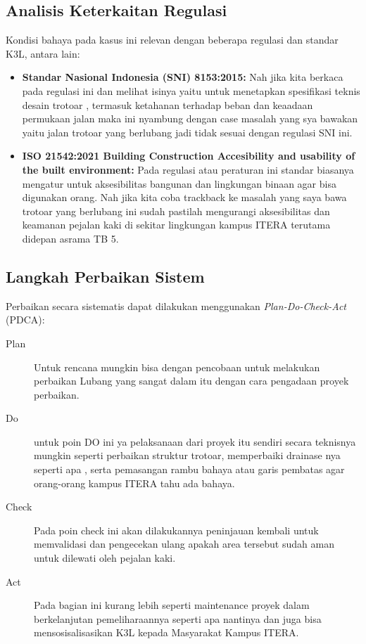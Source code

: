 \documentclass[a4paper, 12pt]{article}
\begin{document}
\subsection{Analisis Keterkaitan Regulasi}
Kondisi bahaya pada kasus ini relevan dengan beberapa regulasi dan standar K3L, antara lain:
\begin{itemize}
    \item \textbf{Standar Nasional Indonesia (SNI) 8153:2015:} Nah jika kita berkaca pada regulasi ini dan melihat isinya yaitu untuk menetapkan spesifikasi teknis desain trotoar , termasuk ketahanan terhadap beban dan keaadaan permukaan jalan maka ini nyambung dengan case masalah yang sya bawakan yaitu jalan trotoar yang berlubang jadi tidak sesuai dengan regulasi SNI ini.
    \item \textbf{ISO 21542:2021 Building Construction Accesibility and usability of the built environment:} Pada regulasi atau peraturan ini standar biasanya mengatur untuk aksesibilitas bangunan dan lingkungan binaan agar bisa digunakan orang. Nah jika kita coba trackback ke masalah yang saya bawa trotoar yang berlubang ini sudah pastilah mengurangi aksesibilitas dan keamanan pejalan kaki di sekitar lingkungan kampus ITERA terutama didepan asrama TB 5.
\end{itemize}

\subsection{Langkah Perbaikan Sistem}
Perbaikan secara sistematis dapat dilakukan menggunakan \textit{Plan-Do-Check-Act} (PDCA):
\begin{description}
    \item[Plan] Untuk rencana mungkin bisa dengan pencobaan untuk melakukan perbaikan Lubang yang sangat dalam itu dengan cara pengadaan proyek perbaikan.
    \item[Do] untuk poin DO ini ya pelaksanaan dari proyek itu sendiri secara teknisnya mungkin seperti perbaikan struktur trotoar, memperbaiki drainase nya seperti apa , serta pemasangan rambu bahaya atau garis pembatas agar orang-orang kampus ITERA tahu ada bahaya.
    \item[Check] Pada poin check ini akan dilakukannya peninjauan kembali untuk memvalidasi dan pengecekan ulang apakah area tersebut sudah aman untuk dilewati oleh pejalan kaki.
    \item[Act] Pada bagian ini kurang lebih seperti maintenance proyek dalam berkelanjutan pemeliharaannya seperti apa nantinya dan juga bisa mensosisalisasikan K3L kepada Masyarakat Kampus ITERA. 
\end{description}
\end{document}

